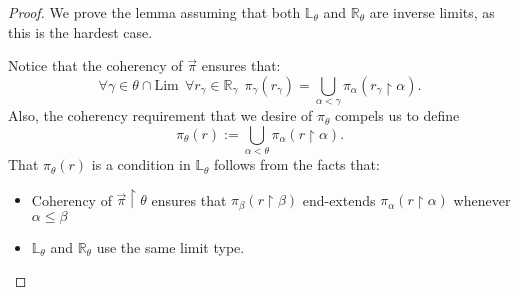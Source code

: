 \documentclass{amsart}
\begin{document}
\begin{proof}
We prove the lemma assuming that both $\mathbb{L}_\theta$ and $\mathbb{R}_\theta$ are inverse limits, as this is the hardest case.

Notice that the coherency of $\vec{\pi}$ ensures that:
\begin{equation}\label{eq_WhatLimitsMustLookLike}
\forall \gamma \in \theta \cap \text{Lim} \ \  \forall r_\gamma \in \mathbb{R}_\gamma \ \ \pi_\gamma(r_\gamma) = \bigcup_{\alpha < \gamma} \pi_\alpha(r_\gamma \restriction \alpha).
\end{equation}
Also, the coherency requirement that we desire of $\pi_\theta$ compels us to define 
\begin{equation*}
\pi_\theta(r):=  \bigcup_{\alpha < \theta} \pi_\alpha(r \restriction \alpha).
\end{equation*}
That $\pi_\theta(r)$ is a condition in $\mathbb{L}_\theta$ follows from the facts that:
\begin{itemize}
 \item Coherency of $\vec{\pi}\restriction \theta$ ensures that $\pi_\beta(r \restriction \beta)$ end-extends $\pi_\alpha(r \restriction \alpha)$ whenever $\alpha \le \beta$
 \item $\mathbb{L}_\theta$ and $\mathbb{R}_\theta$ use the same limit type.
\end{itemize} 


\end{proof}
\end{document}
